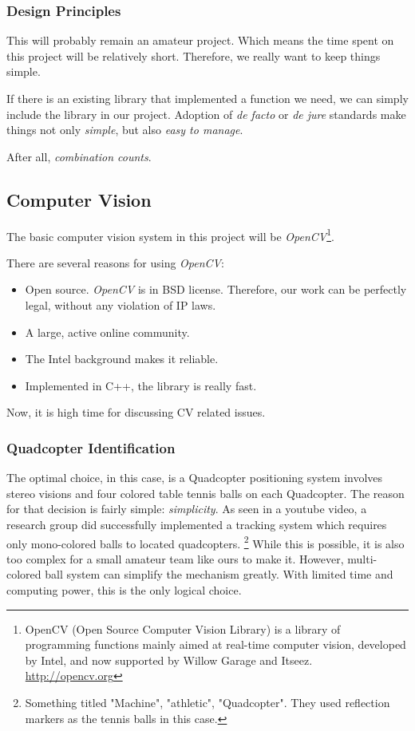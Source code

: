 \subsubsection{Design Principles}

This will probably remain an amateur project. Which means the time spent on this project will be relatively short. Therefore, we really want to keep things simple.

If there is an existing library that implemented a function we need, we can simply include the library in our project. Adoption of \emph{de facto} or \emph{de jure} standards make things not only \emph{simple}, but also \emph{easy to manage}.

After all, \emph{combination counts}.

\subsection{Computer Vision}
The basic computer vision system in this project will be \emph{OpenCV}\footnote{ OpenCV (Open Source Computer Vision Library) is a library of programming functions mainly aimed at real-time computer vision, developed by Intel, and now supported by Willow Garage and Itseez. \url{http://opencv.org}}.

There are several reasons for using \emph{OpenCV}:
\begin{itemize}
  \item Open source. \emph{OpenCV} is in BSD license. Therefore, our work can be perfectly legal, without any violation of IP laws.
  \item A large, active online community.
  \item The Intel background makes it reliable.
  \item Implemented in C++, the library is really fast.
\end{itemize}
Now, it is high time for discussing CV related issues.
\subsubsection{Quadcopter Identification}
The optimal choice, in this case, is a Quadcopter positioning system involves stereo visions and four colored table tennis balls on each Quadcopter.
The reason for that decision is fairly simple: \emph{simplicity}.
As seen in a youtube video, a research group did successfully implemented a tracking system which requires only mono-colored balls to located quadcopters. \footnote{Something titled "Machine", "athletic", "Quadcopter". They used reflection markers as the tennis balls in this case.} While this is possible, it is also too complex for a small amateur team like ours to make it. However, multi-colored ball system can simplify the mechanism greatly. With limited time and computing power, this is the only logical choice.
